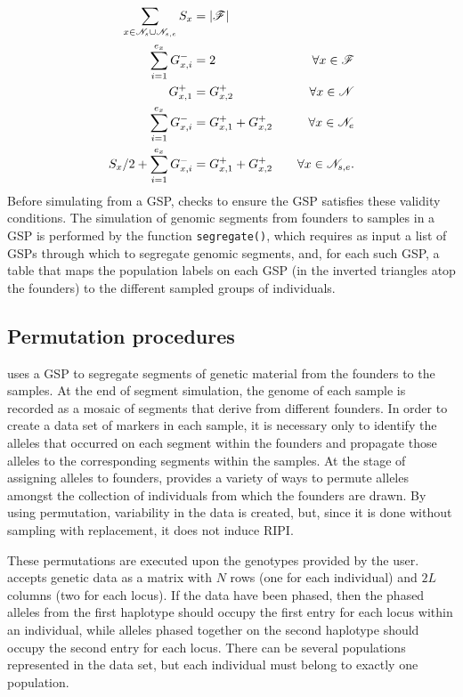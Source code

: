 \begin{equation}
\begin{aligned}
\sum_{x \in \mathscr{N}_s \cup \mathscr{N}_{s,e}} S_x &= |\mathscr{F}| &  \\
\sum_{i=1}^{e_x} G^-_{x,i} &= 2 & \forall x \in \mathscr{F} \\
G^+_{x,1} &= G^+_{x,2} & \forall x \in \mathscr{N} \\
\sum_{i=1}^{e_x} G^-_{x,i} &= G^+_{x,1} +  G^+_{x,2} & \forall x \in \mathscr{N}_e  \\
 S_x/2 + \sum_{i=1}^{e_x} G^-_{x,i} &= G^+_{x,1} +  G^+_{x,2} & ~~~\forall x \in \mathscr{N}_{s,e}.  \\
\end{aligned}
\end{equation}
Before simulating from a GSP, \gscramble{} checks to ensure the GSP
satisfies these validity conditions.  The simulation of genomic segments
from founders to samples in a GSP is performed by the \gscramble{} function
{\footnotesize\tt segregate()}, which requires as input a list of GSPs through which
to segregate genomic segments, and, for each such GSP, a table that maps the
population labels on each GSP (in the inverted triangles atop the founders) to the
different sampled groups of individuals.

\subsection*{Permutation procedures}

\gscramble{} uses a GSP to segregate segments of genetic material from the founders
to the samples.  At the end of segment simulation, the genome of each sample
is recorded as a mosaic of segments that derive from different founders.  In order
to create a data set of markers in each sample, it is necessary only to identify the alleles
that occurred on each segment within the founders and propagate those alleles to the
corresponding segments within the samples.  At the stage of assigning alleles to
founders, \gscramble{} provides a variety of ways to permute alleles amongst
the collection of individuals from which the founders are drawn.  By using permutation,
variability in the data is created, but, since it is done without sampling with replacement, it does
not induce RIPI.

These permutations are executed upon the genotypes provided by the user.
\gscramble{} accepts genetic data as a matrix with $N$ rows (one for each individual) and
$2L$ columns (two for each locus). If the data have been phased, then the phased alleles from the
first haplotype should occupy the
first entry for each locus within an individual, while alleles phased together on the second haplotype should occupy the
second entry for each locus. 
There can be several populations represented in the data set, but
each individual must belong to exactly one
population.  

